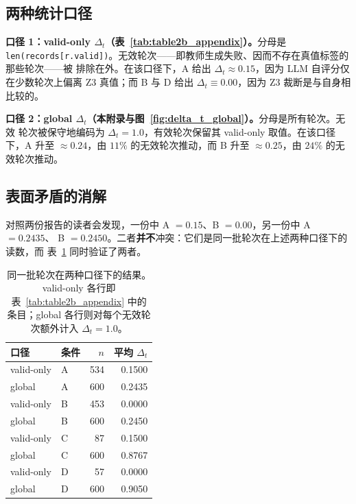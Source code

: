 \documentclass{article}
\begin{document}
\subsection{两种统计口径}
\label{sec:calibers}

\textbf{口径 1：valid-only $\Delta_t$（表~\ref{tab:table2b_appendix}）。}分母是
\texttt{len(records[r.valid])}。无效轮次——即教师生成失败、因而不存在真值标签的那些轮次——被
排除在外。在该口径下，A 给出 $\Delta_t \approx 0.15$，因为 LLM 自评分仅在少数轮次上偏离 Z3
真值；而 B 与 D 给出 $\Delta_t \equiv 0.00$，因为 Z3 裁断是与自身相比较的。

\textbf{口径 2：global $\Delta_t$（本附录与图~\ref{fig:delta_t_global}）。}分母是所有轮次。无效
轮次被保守地编码为 $\Delta_t = 1.0$，有效轮次保留其 valid-only 取值。在该口径下，A 升至
$\approx 0.24$，由 $11\%$ 的无效轮次推动，而 B 升至 $\approx 0.25$，由 $24\%$ 的无效轮次推动。

\subsection{表面矛盾的消解}

对照两份报告的读者会发现，一份中 A $= 0.15$、B $= 0.00$，另一份中 A $= 0.2435$、
B $= 0.2450$。二者\textbf{并不}冲突：它们是同一批轮次在上述两种口径下的读数，而
表~\ref{tab:table2c_calibers} 同时验证了两者。

\begin{table}[t]
  \centering
  \caption{同一批轮次在两种口径下的结果。valid-only 各行即表~\ref{tab:table2b_appendix} 中的
  条目；global 各行则对每个无效轮次额外计入 $\Delta_t = 1.0$。}
  \label{tab:table2c_calibers}
  \small
  \begin{tabular}{@{}llrr@{}}
    \toprule
    口径 & 条件 & $n$ & 平均 $\Delta_t$ \\
    \midrule
    valid-only & A & 534 & 0.1500 \\
    global     & A & 600 & 0.2435 \\
    valid-only & B & 453 & 0.0000 \\
    global     & B & 600 & 0.2450 \\
    valid-only & C & 87  & 0.1500 \\
    global     & C & 600 & 0.8767 \\
    valid-only & D & 57  & 0.0000 \\
    global     & D & 600 & 0.9050 \\
    \bottomrule
  \end{tabular}
\end{table}
\end{document}
